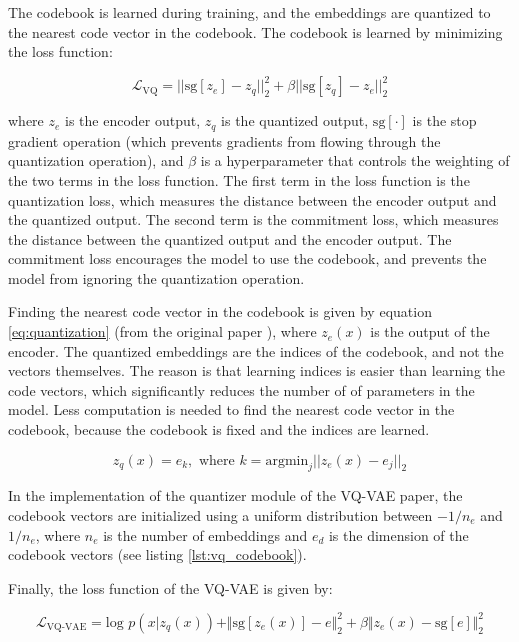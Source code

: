 The codebook is learned during training, and the embeddings are quantized to the nearest code vector in the codebook. The codebook is learned by minimizing the loss function:

\begin{equation}
    \mathcal{L}_{\text{VQ}} = || \text{sg}[z_e] - z_q ||_2^2 + \beta || \text{sg}[z_q] - z_e ||_2^2
\label{eq:vq_loss}
\end{equation}

where $z_e$ is the encoder output, $z_q$ is the quantized output, $\text{sg}[\cdot]$ is the stop gradient operation (which prevents gradients from flowing through the quantization operation), and $\beta$ is a hyperparameter that controls the weighting of the two terms in the loss function. The first term in the loss function is the quantization loss, which measures the distance between the encoder output and the quantized output. The second term is the commitment loss, which measures the distance between the quantized output and the encoder output. The commitment loss encourages the model to use the codebook, and prevents the model from ignoring the quantization operation.

Finding the nearest code vector in the codebook is given by equation \ref{eq:quantization} (from the original paper \cite{vqvae}), where $z_e(x)$ is the output of the encoder. The quantized embeddings are the indices of the codebook, and not the vectors themselves. The reason is that learning indices is easier than learning the code vectors, which significantly reduces the number of of parameters in the model. Less computation is needed to find the nearest code vector in the codebook, because the codebook is fixed and the indices are learned.

\begin{equation}
    \label{eq:quantization}
    z_q(x)=e_k, \text{  where } k = \text{argmin}_j || z_e(x) - e_j ||_2
\end{equation}

In the implementation of the quantizer module of the VQ-VAE paper, the codebook vectors are initialized using a uniform distribution between $-1/n_e$ and $1/n_e$, where $n_e$ is the number of embeddings and $e_d$ is the dimension of the codebook vectors (see listing \ref{lst:vq_codebook}).

Finally, the loss function of the VQ-VAE is given by:

\begin{equation}
    \mathcal{L}_\text{VQ-VAE} = \text{log } p(x|z_q(x)) + \Vert \text{sg}[z_e(x)] - e \Vert_2^2 + \beta \Vert z_e(x) - \text{sg}[e] \Vert_2^2
    \label{eq:vqvae_loss}
\end{equation}
    
